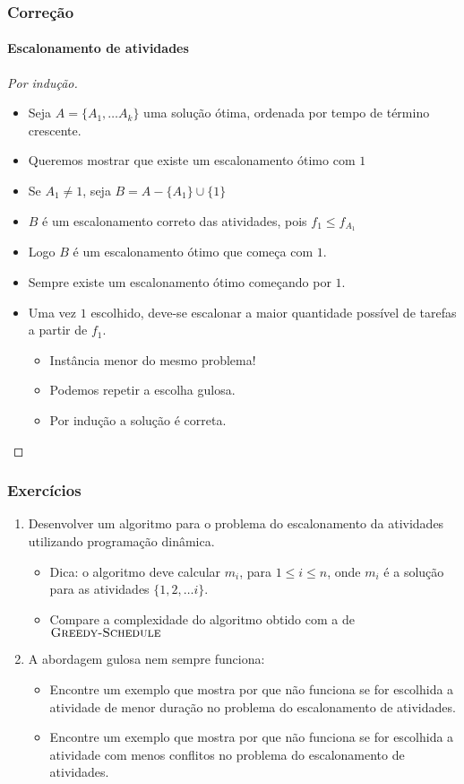 \documentclass{beamer}
\begin{document}
\begin{frame}
\frametitle{Correção}
\framesubtitle{Escalonamento de atividades}

\begin{proof}[Por indução]
\begin{itemize}
\item Seja $A = \{ A_1, \ldots A_k \} $ uma solução ótima, ordenada por 
tempo de término crescente.
\item Queremos mostrar que existe um escalonamento ótimo com $1$
\item Se $A_1 \neq 1$, seja $B = A - \{ A_1 \} \cup \{ 1 \}$
\item $B$ é um escalonamento correto das atividades, pois $f_1 \le f_{A_1}$
\item Logo $B$ é um escalonamento ótimo que começa com $1$.
\item Sempre existe um escalonamento ótimo começando por $1$.
\item Uma vez $1$ escolhido, deve-se escalonar a maior quantidade possível
de tarefas a partir de $f_1$.
\begin{itemize}
\item Instância menor do mesmo problema!
\item Podemos repetir a escolha gulosa.
\item Por indução a solução é correta.
\end{itemize}
\end{itemize}
\end{proof}

\end{frame}


\begin{frame}
\frametitle{Exercícios}
\begin{enumerate}
\item Desenvolver um algoritmo para o problema do escalonamento da atividades utilizando \alert{programação dinâmica}.
\begin{itemize}
\item Dica: o algoritmo deve calcular $m_i$, para $1 \le i \le n$, onde $m_i$ é 
a solução para as atividades $\{1, 2, \ldots i\}$.
\item Compare a complexidade do algoritmo obtido com a de $\textnormal{\scshape Greedy-Schedule}$
\end{itemize}
\item A abordagem gulosa nem sempre funciona:
\begin{itemize}
\item Encontre um exemplo que mostra por que não funciona se for escolhida a atividade de menor duração no problema do escalonamento de atividades.
\item Encontre um exemplo que mostra por que não funciona se for escolhida a atividade com menos conflitos no problema do escalonamento de atividades.
\end{itemize}
\end{enumerate}
\end{frame}
\end{document}
